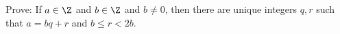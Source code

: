   Prove: If $a \in \Z$ and $b \in \Z$ and $b \neq 0$, then there are
  unique integers $q,r$ such that $a = bq + r$ and $b \leq r < 2b$.
